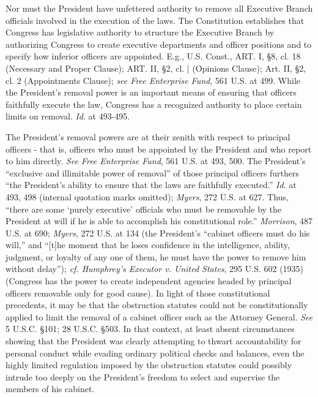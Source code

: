 Nor must the President have unfettered authority to remove all Executive Branch officials involved in the execution of the laws.
The Constitution establishes that Congress has legislative authority to structure the Executive Branch by authorizing Congress to create executive departments and officer positions and to specify how inferior officers are appointed.
E.g., U.S. Const., ART. I, \S 8, cl. 18 (Necessary and Proper Clause); ART. II, \S 2, cl. | (Opinions Clause); Art. II, \S 2, cl. 2 (Appointments Clause);
\textit{see Free Enterprise Fund}, 561 U.S. at 499. While the President’s removal power is an important means of ensuring that officers faithfully execute the law, Congress has a recognized authority to place certain limits on removal.
\textit{Id}. at 493-495.

The President’s removal powers are at their zenith with respect to principal officers - that is, officers who must be appointed by the President and who report to him directly.
\textit{See Free Enterprise Fund}, 561 U.S. at 493, 500.
The President’s “exclusive and illimitable power of removal” of those principal officers furthers “the President’s ability to ensure that the laws are faithfully executed.”
\textit{Id}. at 493, 498 (internal quotation marks omitted);
\textit{Myers}, 272 U.S. at 627.
Thus, “there are some ‘purely executive’ officials who must be removable by the President at will if he is able to accomplish his constitutional role.”
\textit{Morrison}, 487 U.S. at 690;
\textit{Myers}, 272 U.S. at 134 (the President’s “cabinet officers must do his will,” and “[t]he moment that he loses confidence in the intelligence, ability, judgment, or loyalty of any one of them, he must have the power to remove him without delay”);
\textit{cf. Humphrey’s Executor v. United States}, 295 U.S. 602 (1935) (Congress has the power to create independent agencies headed by principal officers removable only for good cause).
In light of those constitutional precedents, it may be that the obstruction statutes could not be constitutionally applied to limit the removal of a cabinet officer such as the Attorney General.
\textit{See} 5 U.S.C. \S 101; 28 U.S.C. \S 503.
In that context, at least absent circumstances showing that the President was clearly attempting to thwart accountability for personal conduct while evading ordinary political checks and balances, even the highly limited regulation imposed by the obstruction statutes could possibly intrude too deeply on the President’s freedom to select and supervise the members of his cabinet.

